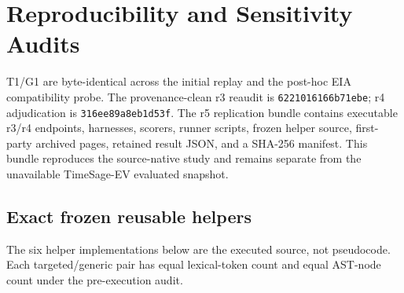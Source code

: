 \section{Reproducibility and Sensitivity Audits}
T1/G1 are byte-identical across the initial replay and the post-hoc EIA compatibility probe. The provenance-clean r3 reaudit is \texttt{6221016166b71ebe}; r4 adjudication is \texttt{316ee89a8eb1d53f}. The r5 replication bundle contains executable r3/r4 endpoints, harnesses, scorers, runner scripts, frozen helper source, first-party archived pages, retained result JSON, and a SHA-256 manifest. This bundle reproduces the source-native study and remains separate from the unavailable TimeSage-EV evaluated snapshot.

\subsection{Exact frozen reusable helpers}
The six helper implementations below are the executed source, not pseudocode. Each targeted/generic pair has equal lexical-token count and equal AST-node count under the pre-execution audit.

